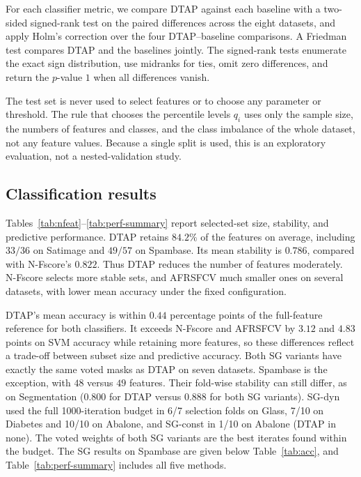 \documentclass[]{interact}
\theoremstyle{plain}
\theoremstyle{definition}
\theoremstyle{remark}
\begin{document}
For each classifier metric, we compare DTAP against each baseline with a two-sided signed-rank test on the paired differences across the eight datasets, and apply Holm's correction over the four DTAP--baseline comparisons. A Friedman test compares DTAP and the baselines jointly. The signed-rank tests enumerate the exact sign distribution, use midranks for ties, omit zero differences, and return the $p$-value $1$ when all differences vanish.

The test set is never used to select features or to choose any parameter or threshold. The rule that chooses the percentile levels $q_i$ uses only the sample size, the numbers of features and classes, and the class imbalance of the whole dataset, not any feature values. Because a single split is used, this is an exploratory evaluation, not a nested-validation study.

\subsection{Classification results}\label{ssec:results}
Tables~\ref{tab:nfeat}--\ref{tab:perf-summary} report selected-set size, stability, and predictive performance. DTAP retains $84.2\%$ of the features on average, including $33/36$ on Satimage and $49/57$ on Spambase. Its mean stability is $0.786$, compared with N-Fscore's $0.822$. Thus DTAP reduces the number of features moderately. N-Fscore selects more stable sets, and AFRSFCV much smaller ones on several datasets, with lower mean accuracy under the fixed configuration.

DTAP's mean accuracy is within $0.44$ percentage points of the full-feature reference for both classifiers. It exceeds N-Fscore and AFRSFCV by $3.12$ and $4.83$ points on SVM accuracy while retaining more features, so these differences reflect a trade-off between subset size and predictive accuracy. Both SG variants have exactly the same voted masks as DTAP on seven datasets. Spambase is the exception, with $48$ versus $49$ features. Their fold-wise stability can still differ, as on Segmentation ($0.800$ for DTAP versus $0.888$ for both SG variants). SG-dyn used the full 1000-iteration budget in 6/7 selection folds on Glass, 7/10 on Diabetes and 10/10 on Abalone, and SG-const in 1/10 on Abalone (DTAP in none). The voted weights of both SG variants are the best iterates found within the budget. The SG results on Spambase are given below Table~\ref{tab:acc}, and Table~\ref{tab:perf-summary} includes all five methods.
\end{document}
